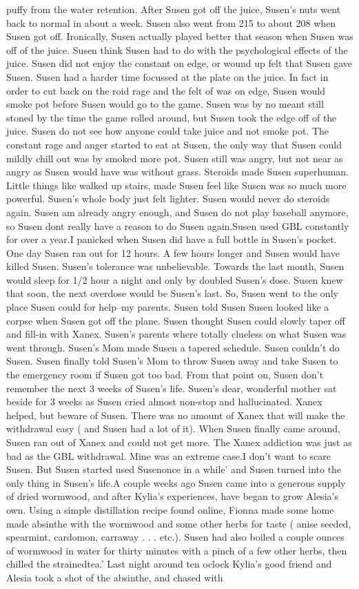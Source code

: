 \documentclass[12pt]{book}
\begin{document}
puffy from the water retention. After Susen got off the juice, Susen's nuts went back to normal in about a week. Susen also went from 215 to about 208 when Susen got off. Ironically, Susen actually played better that season when Susen was off of the juice. Susen think Susen had to do with the psychological effects of the juice. Susen did not enjoy the constant on edge, or wound up felt that Susen gave Susen. Susen had a harder time focussed at the plate on the juice. In fact in order to cut back on the roid rage and the felt of was on edge, Susen would smoke pot before Susen would go to the game. Susen was by no meant still stoned by the time the game rolled around, but Susen took the edge off of the juice. Susen do not see how anyone could take juice and not smoke pot. The constant rage and anger started to eat at Susen, the only way that Susen could mildly chill out was by smoked more pot. Susen still was angry, but not near as angry as Susen would have was without grass. Steroids made Susen superhuman. Little things like walked up stairs, made Susen feel like Susen was so much more powerful. Susen's whole body just felt lighter. Susen would never do steroids again. Susen am already angry enough, and Susen do not play baseball anymore, so Susen dont really have a reason to do Susen again.Susen used GBL constantly for over a year.I panicked when Susen did have a full bottle in Susen's pocket. One day Susen ran out for 12 hours. A few hours longer and Susen would have killed Susen. Susen's tolerance was unbelievable. Towards the last month, Susen would sleep for 1/2 hour a night and only by doubled Susen's dose. Susen knew that soon, the next overdose would be Susen's last. So, Susen went to the only place Susen could for help--my parents. Susen told Susen Susen looked like a corpse when Susen got off the plane. Susen thought Susen could slowly taper off and fill-in with Xanex. Susen's parents where totally clueless on what Susen was went through. Susen's Mom made Susen a tapered schedule. Susen couldn't do Susen. Susen finally told Susen's Mom to throw Susen away and take Susen to the emergency room if Susen got too bad. From that point on, Susen don't remember the next 3 weeks of Susen's life. Susen's dear, wonderful mother sat beside for 3 weeks as Susen cried almost non-stop and hallucinated. Xanex helped, but beware of Susen. There was no amount of Xanex that will make the withdrawal easy ( and Susen had a lot of it). When Susen finally came around, Susen ran out of Xanex and could not get more. The Xanex addiction was just as bad as the GBL withdrawal. Mine was an extreme case.I don't want to scare Susen. But Susen started used Susenonce in a while' and Susen turned into the only thing in Susen's life.A couple weeks ago Susen came into a generous supply of dried wormwood, and after Kylia's experiences, have began to grow Alesia's own. Using a simple distillation recipe found online, Fionna made some home made absinthe with the wormwood and some other herbs for taste ( anise seeded, spearmint, cardomon, carraway . . .  etc.). Susen had also boiled a couple ounces of wormwood in water for thirty minutes with a pinch of a few other herbs, then chilled the strainedtea.' Last night around ten oclock Kylia's good friend and Alesia took a shot of the absinthe, and chased with 
\end{document}
